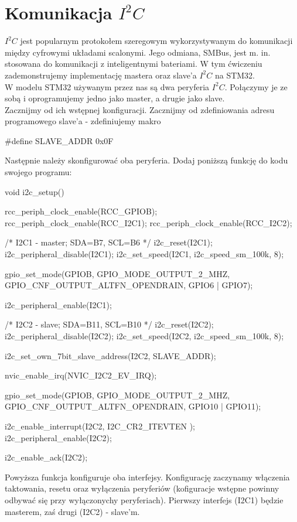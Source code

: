\documentclass{pdfBooklets}
\begin{document}
\section{Komunikacja $I^2C$}
$I^2C$ jest popularnym protokołem szeregowym wykorzystywanym do komunikacji między cyfrowymi układami scalonymi. Jego odmiana, SMBus, jest m. in.
stosowana do komunikacji z inteligentnymi bateriami. W tym ćwiczeniu zademonstrujemy implementację mastera oraz slave'a $I^2C$ na STM32.\\

W modelu STM32 używanym przez nas są dwa peryferia $I^2C$. Połączymy je ze sobą i oprogramujemy jedno jako master, a drugie jako slave.\\
Zacznijmy od ich wstępnej konfiguracji. Zacznijmy od zdefiniowania adresu programowego slave'a - zdefiniujemy makro

\begin{CodeFrame*}[c]{}
#define SLAVE_ADDR 0x0F
\end{CodeFrame*}

Następnie należy skonfigurować oba peryferia. Dodaj poniższą funkcję do kodu swojego programu:

\begin{CodeFrame*}[c]{}
void i2c_setup(){
  rcc_periph_clock_enable(RCC_GPIOB);
  rcc_periph_clock_enable(RCC_I2C1);
  rcc_periph_clock_enable(RCC_I2C2);


  /* I2C1 - master; SDA=B7, SCL=B6 */
  i2c_reset(I2C1);
  i2c_peripheral_disable(I2C1);
  i2c_set_speed(I2C1, i2c_speed_sm_100k, 8);

  gpio_set_mode(GPIOB, GPIO_MODE_OUTPUT_2_MHZ,
		  GPIO_CNF_OUTPUT_ALTFN_OPENDRAIN, GPIO6 | GPIO7);
  
  i2c_peripheral_enable(I2C1);


  /* I2C2 - slave; SDA=B11, SCL=B10 */
  i2c_reset(I2C2);
  i2c_peripheral_disable(I2C2);
  i2c_set_speed(I2C2, i2c_speed_sm_100k, 8);

  i2c_set_own_7bit_slave_address(I2C2, SLAVE_ADDR);

  nvic_enable_irq(NVIC_I2C2_EV_IRQ);
  
  gpio_set_mode(GPIOB, GPIO_MODE_OUTPUT_2_MHZ,
		  GPIO_CNF_OUTPUT_ALTFN_OPENDRAIN, GPIO10 | GPIO11);

  i2c_enable_interrupt(I2C2, I2C_CR2_ITEVTEN );
  i2c_peripheral_enable(I2C2);

  
  i2c_enable_ack(I2C2);
}
\end{CodeFrame*}

Powyższa funkcja konfiguruje oba interfejsy. Konfigurację zaczynamy włączenia taktowania, resetu oraz wyłączenia peryferiów (kofiguracje wstępne
powinny odbywać się przy wyłączonychy peryferiach). Pierwszy interfejs (I2C1) będzie masterem,
zaś drugi (I2C2) - slave'm.\\
\end{document}
